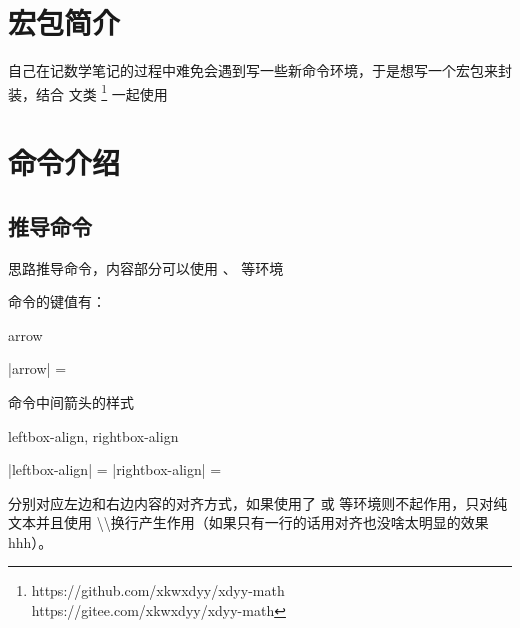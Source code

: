 \documentclass{xdyy-usermanual}
\begin{document}
\section{宏包简介}

自己在记数学笔记的过程中难免会遇到写一些新命令环境，于是想写一个宏包来封装，结合  文类 \footnote{
  https://github.com/xkwxdyy/xdyy-math \\
  https://gitee.com/xkwxdyy/xdyy-math
}
一起使用


\section{命令介绍}


\subsection{推导命令  }

\begin{function}[added = 2022-1-12]{\deduce}
  \begin{syntax}
       
  \end{syntax}
  思路推导命令，内容部分可以使用 、 等环境
  \begin{hexample}
  \end{hexample}
\end{function}

 命令的键值有：

\begin{function}[added = 2022-01-12]{arrow}
  \begin{syntax}
    |arrow| =  \init{$\Longrightarrow$}
  \end{syntax}
  命令中间箭头的样式
\end{function}

\begin{function}[added = 2022-01-12]{leftbox-align, rightbox-align}
  \begin{syntax}
    |leftbox-align| =  
    |rightbox-align| =  
  \end{syntax}
  分别对应左边和右边内容的对齐方式，如果使用了  或  等环境则不起作用，只对纯文本并且使用 \textbackslash \textbackslash 换行产生作用（如果只有一行的话用对齐也没啥太明显的效果hhh）。
\end{function}
\end{document}
